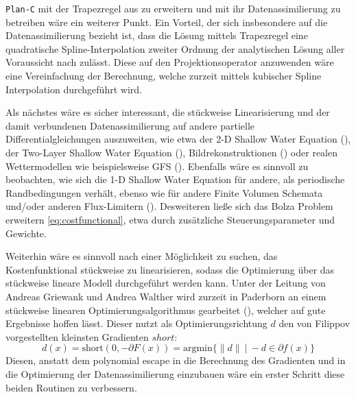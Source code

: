 \texttt{Plan-C} mit der Trapezregel aus \cite[S.23 (15)]{monster} zu erweitern und mit ihr Datenassimilierung zu betreiben wäre ein weiterer Punkt.
Ein Vorteil, der sich insbesondere auf die Datenassimilierung bezieht ist, dass die Lösung mittels Trapezregel eine quadratische Spline-Interpolation zweiter Ordnung der analytischen Lösung aller Voraussicht nach zulässt. Diese auf den Projektionsoperator anzuwenden wäre eine Vereinfachung der Berechnung, welche zurzeit mittels kubischer Spline Interpolation durchgeführt wird.

Als nächstes wäre es sicher interessant, die stückweise Linearisierung und der damit verbundenen Datenassimilierung auf andere partielle Differentialgleichungen auszuweiten, wie etwa der 2-D Shallow Water Equation (\cite[\S 3]{kurganov2007second}), der Two-Layer Shallow Water Equation (\cite{kurganov2009central}), Bildrekonstruktionen (\cite{korotaev2008retrieving}) oder realen Wettermodellen wie beispielsweise GFS (\cite{gfs}). 
Ebenfalls wäre es sinnvoll zu beobachten, wie sich die 1-D Shallow Water Equation für andere, als periodische Randbedingungen verhält, ebenso wie für andere Finite Volumen Schemata und/oder anderen Flux-Limitern (\cite{juntasaro2004comparative}).
Desweiteren ließe sich das Bolza Problem erweitern \eqref{eq:costfunctional}, etwa durch zusätzliche Steuerungsparameter und Gewichte. 

Weiterhin wäre es sinnvoll nach einer Möglichkeit zu suchen, das Kostenfunktional stückweise zu linearisieren, sodass die Optimierung über das stückweise lineare Modell durchgeführt werden kann.
Unter der Leitung von Andreas Griewank und Andrea Walther wird zurzeit in Paderborn an einem stückweise linearen Optimierungsalgorithmus gearbeitet (\cite{griewank2014lipschitz}), welcher auf gute Ergebnisse hoffen lässt. 
Dieser nutzt als Optimierungsrichtung $d$ den von Filippov vorgestellten kleinsten Gradienten $short$:
\[
d(x) = \text{short}(0,-\partial F(x)) = \text{argmin} \lbrace \|d\| ~|~ -d \in \partial f(x) \rbrace
\]
Diesen, anstatt dem polynomial escape in die Berechnung des Gradienten und in die Optimierung der Datenassimilierung einzubauen wäre ein erster Schritt diese beiden Routinen zu verbessern.
